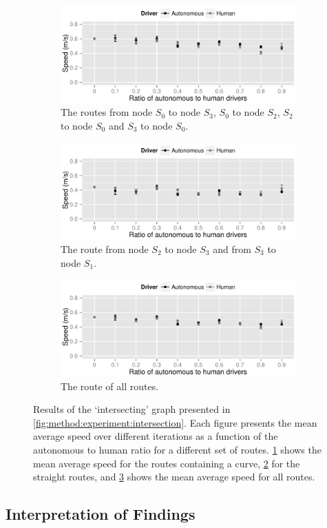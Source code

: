 \begin{figure}
	\centering
	\begin{subfigure}{\textwidth}
		\centering
		\includegraphics[width=\textwidth]{./img/results_intersecting_03_01}
		\caption{The routes from node $S_0$ to node $S_3$, $S_0$ to node $S_2$, $S_2$ to node $S_0$ and $S_3$ to node $S_0$.}
		\label{fig:results:intersecting:03}
	\end{subfigure}
	\begin{subfigure}{\textwidth}
		\centering
		\includegraphics[width=\textwidth]{./img/results_intersecting_13}
		\caption{The route from node $S_2$ to node $S_3$ and from $S_3$ to node $S_1$.}
		\label{fig:results:intersecting:13}
	\end{subfigure}	
	\begin{subfigure}{\textwidth}
		\centering
		\includegraphics[width=\textwidth]{./img/results_intersecting}
		\caption{The route of all routes.}
		\label{fig:results:intersecting:all}
	\end{subfigure}		
	\caption{Results of the `intersecting' graph presented in \cref{fig:method:experiment:intersection}. Each figure presents the mean average speed over different iterations as a function of the autonomous to human ratio for a different set of routes. \ref{fig:results:intersecting:03} shows the mean average speed for the routes containing a curve, \ref{fig:results:intersecting:13} for the straight routes, and \ref{fig:results:intersecting:all} shows the mean average speed for all routes.}
	\label{fig:results:intersecting}
\end{figure}

\subsection{Interpretation of Findings}
\label{sub:results:interpretation}

